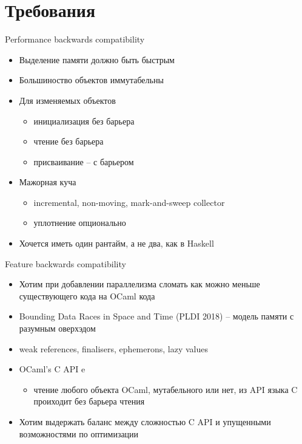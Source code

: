 \documentclass[aspectratio=169
  , xcolor={svgnames} 
  , hyperref={ colorlinks,citecolor=DeepPink4
             , linkcolor=DarkRed,urlcolor=DarkBlue}
  , russian
  ]{beamer}
\theoremstyle{exerciseStyle1}
\begin{document}
\section{Требования}
\begin{frame}[fragile]{Performance backwards compatibility}
\begin{itemize}
  \item  Выделение памяти должно быть быстрым
  \item Большиноство объектов иммутабельны
  \item Для изменяемых объектов
  \begin{itemize}
  \item инициализация без барьера
  \item чтение без барьера
  \item присваивание -- с барьером
  \end{itemize}
  \item Мажорная куча
  \begin{itemize}
  \item  incremental, non-moving, mark-and-sweep collector
  \item уплотнение опционально
  \end{itemize}
  \item Хочется иметь один рантайм, а не два, как в Haskell
\end{itemize}

\end{frame}

\begin{frame}{ Feature backwards compatibility}
\begin{itemize}
  \item Хотим при добавлении параллелизма сломать как можно меньше существующего кода на OCaml кода 
  \item  Bounding Data Races in Space and Time (PLDI 2018)
  -- модель памяти с разумным оверхэдом

  \item weak references, finalisers, ephemerons, lazy values
  \item OCaml’s C API e
  \begin{itemize}
\item  чтение любого объекта OCaml, мутабельного или нет, из API языка C проиходит без барьера чтения
  \end{itemize}
\item Хотим выдержать баланс между сложностью C API и упущенными возможностями по оптимизации
\end{itemize}

\end{frame}
\end{document}
